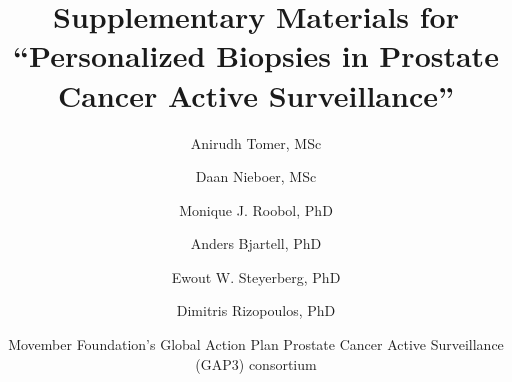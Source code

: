 \documentclass[preprint, 12pt]{elsarticle}
\begin{document}
\begin{frontmatter}
\title{Supplementary Materials for ``Personalized Biopsies in Prostate Cancer Active Surveillance''}

\author[1]{Anirudh Tomer, MSc} 

\author[2]{Daan Nieboer, MSc}

\author[3]{Monique J. Roobol, PhD}

\author[4]{Anders Bjartell, PhD}

\author[2,5]{Ewout W. Steyerberg, PhD}

\author[1]{Dimitris Rizopoulos, PhD}

\author[6]{Movember Foundation’s Global Action Plan Prostate Cancer Active Surveillance (GAP3) consortium}

\address[1]{Department of Biostatistics, Erasmus University Medical Center, Rotterdam, the Netherlands}
\address[2]{Department of Public Health, Erasmus University Medical Center, Rotterdam, the Netherlands}
\address[3]{Department of Urology, Erasmus University Medical Center, Rotterdam, the Netherlands}
\address[4]{Department of Urology, Sk\r{a}ne University Hospital, Malm\"{o}, Sweden}
\address[5]{Department of Biomedical Data Sciences, Leiden University Medical Center, Leiden, the Netherlands}
\address[6]{The Movember Foundation’s Global Action Plan Prostate Cancer Active Surveillance (GAP3) consortium members presented in Appendix A}

\end{frontmatter}

\linenumbers


\clearpage

\clearpage

\clearpage

\clearpage

\clearpage


\end{document}

